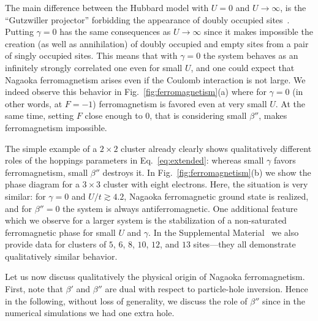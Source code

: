 The main difference between the Hubbard model with $U=0$ and $U\to\infty$, is the ``Gutzwiller projector'' forbidding the appearance of doubly occupied sites~\cite{vollhardt}. Putting $\gamma=0$ has the same consequences as $U\to\infty$ since it makes impossible the creation (as well as annihilation) of doubly occupied and empty sites from a pair of singly occupied sites. This means that with $\gamma=0$ the system behaves as an infinitely strongly correlated one even for small $U$, and one could expect that Nagaoka ferromagnetism arises even if the Coulomb interaction is not large. We indeed observe this behavior in Fig.~\ref{fig:ferromagnetism}(a) where for $\gamma=0$ (in other words, at $F=-1$) ferromagnetism is favored even at very small $U$. At the same time, setting $F$ close enough to $0$, that is considering small $\beta''$, makes ferromagnetism impossible.


The simple example of a $2\times 2$ cluster already clearly shows qualitatively different roles of the hoppings parameters in Eq.~\eqref{eq:extended}: whereas small $\gamma$ favors ferromagnetism, small $\beta''$ destroys it. In Fig.~\ref{fig:ferromagnetism}(b) we show the phase diagram for a $3\times 3$ cluster with eight electrons. Here, the situation is very similar: for $\gamma=0$ and $U/t \gtrsim 4.2$, Nagaoka ferromagnetic ground state is realized, and for $\beta''=0$ the system is always antiferromagnetic. One additional feature which we observe for a larger system is the stabilization of a non-saturated ferromagnetic phase for small $U$ and $\gamma$. In the Supplemental Material~\cite{supplement} we also provide data for clusters of $5$, $6$, $8$, $10$, $12$, and $13$ sites---they all demonstrate qualitatively similar behavior.


Let us now discuss qualitatively the physical origin of Nagaoka ferromagnetism. First, note that $\beta'$ and $\beta''$ are dual with respect to particle-hole inversion. Hence in the following, without loss of generality, we discuss the role of $\beta''$ since in the numerical simulations we had one extra hole.

